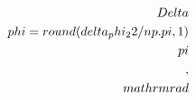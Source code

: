 \documentclass[preview]{standalone}
\begin{document}
\begin{align*}
\special{dvisvgm:raw <g id='unique000'>}\\Delta\\phi = {round(delta_phi_22/np.pi, 1)}\\pi\\,\\mathrm{{rad}}\special{dvisvgm:raw </g>}
\end{align*}
\end{document}
